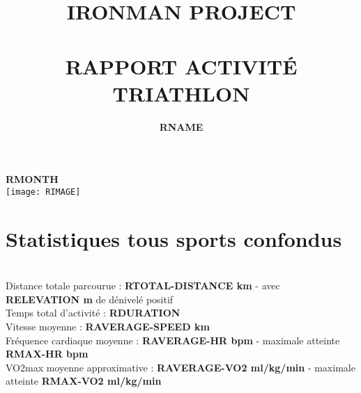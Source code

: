 \documentclass[a4paper,french,11pt]{report}
\title{	\normalsize \textsc{\uppercase{ironman project}}
		 	\\[1.2cm]
			\HRule{0.7pt} \\
			\vspace{0.5cm}
			\LARGE \textbf{\uppercase{rapport activité triathlon}}	%
			\HRule{1pt} \\
			\vspace{1.7cm}
		}
\author{
		\textbf{RNAME}\\
}
\makeatletter
\def\printtitle{%
    {\centering \@title\par}}
\def\printauthor{%
    {\centering \large \@author}}
\makeatother
\begin{document}

\thispagestyle{empty}		%

\printtitle					%
\printauthor				%
\vspace{1cm}

\begin{center}

\LARGE{\textbf{RMONTH}}\\
\vspace{4cm}
\texttt{[image: RIMAGE]}\\

\end{center}

\newpage



\section*{Statistiques tous sports confondus}


\\
\textbullet Distance totale parcourue : \textbf{RTOTAL-DISTANCE km} - avec \textbf{RELEVATION m} de dénivelé positif\\
\textbullet Temps total d'activité : \textbf{RDURATION} \\
\textbullet Vitesse moyenne : \textbf{RAVERAGE-SPEED km} \\
\textbullet Fréquence cardiaque moyenne : \textbf{RAVERAGE-HR bpm} - maximale atteinte \textbf{RMAX-HR bpm}\\
\textbullet VO2max moyenne approximative : \textbf{RAVERAGE-VO2 ml/kg/min} - maximale atteinte \textbf{RMAX-VO2 ml/kg/min}\\
\end{document}
